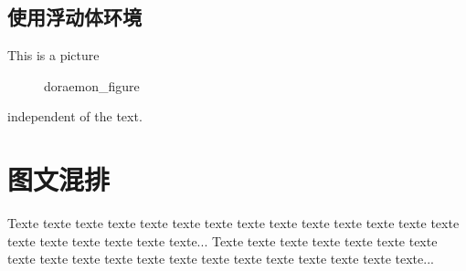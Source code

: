 \documentclass{article}
\begin{document}
\subsection{使用浮动体环境}
    This is a picture 
    \begin{figure}[htbp]
        \centering
        \caption{doraemon\_figure}
    \end{figure}
    independent of the text.

\section{图文混排}
    Texte texte texte texte texte texte texte
    texte texte texte texte texte texte texte
    texte texte texte texte texte texte...
    Texte texte texte texte texte texte texte
    texte texte texte texte texte texte texte
    texte texte texte texte texte texte...
\end{document}
